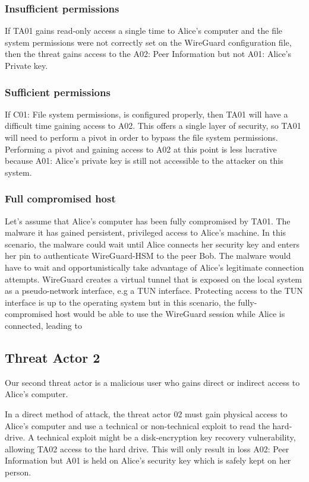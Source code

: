 \documentclass [11pt, proquest] {uwthesis}[2020/02/24]
\begin{document}
\subsubsection{Insufficient permissions}
If TA01 gains read-only access a single time to Alice's computer and the file system permissions were not correctly set on the WireGuard configuration file, then the threat gains access to the A02: Peer Information but not A01: Alice's Private key.

\subsubsection{Sufficient permissions}
If C01: File system permissions, is configured properly, then TA01 will have a difficult time gaining access to A02. This offers a single layer of security, so TA01 will need to perform a pivot in order to bypass the file system permissions. Performing a pivot and gaining access to A02 at this point is less lucrative because A01: Alice's private key is still not accessible to the attacker on this system.

\subsubsection{Full compromised host}
Let's assume that Alice's computer has been fully compromised by TA01. The malware it has gained persistent, privileged access to Alice's machine. In this scenario, the malware could wait until Alice connects her security key and enters her pin to authenticate WireGuard-HSM to the peer Bob. The malware would have to wait and opportunistically take advantage of Alice's legitimate connection attempts.
WireGuard creates a virtual tunnel that is exposed on the local system as a pseudo-network interface, e.g a TUN interface. Protecting access to the TUN interface is up to the operating system but in this scenario, the fully-compromised host would be able to use the WireGuard session while Alice is connected, leading to 


\subsection{Threat Actor 2}
Our second threat actor is a malicious user who gains direct or indirect access to Alice's computer. 

In a direct method of attack, the threat actor 02 must gain physical access to Alice's computer and use a technical or non-technical exploit to read the hard-drive. A technical exploit might be a disk-encryption key recovery vulnerability, allowing TA02 access to the hard drive. This will only result in loss A02: Peer Information but A01 is held on Alice's security key which is safely kept on her person.
\end{document}
